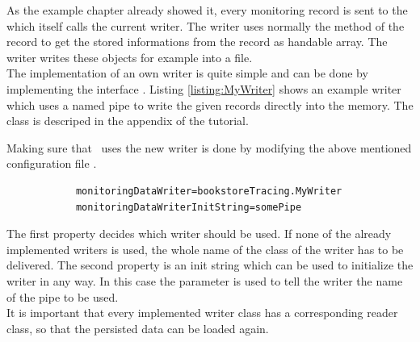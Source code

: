 		As the example chapter already showed it, every monitoring record is sent to the  which itself calls the current writer. The writer uses normally the  method of the record to get the stored informations from the record as handable array. The writer writes these objects for example into a file.\\
		The implementation of an own writer is quite simple and can be done by implementing the interface . Listing \ref{listing:MyWriter} shows an example writer which uses a named pipe to write the given records directly into the memory. The class  is descriped in the appendix of the tutorial. 

		\setJavaCodeListing
		

		Making sure that \Kieker\  uses the new writer is done by modifying the above mentioned configuration file \dir{\monitoringPropertiesFile}.

		\setBashListing       
		\begin{lstlisting}
			monitoringDataWriter=bookstoreTracing.MyWriter
			monitoringDataWriterInitString=somePipe
		\end{lstlisting}

		The first property decides which writer should be used. If none of the already implemented writers is used, the whole name of the class of the writer has to be delivered. The second property is an init string which can be used to initialize the writer in any way. In this case the parameter is used to tell the writer the name of the pipe to be used.\\
		\warning It is important that every implemented writer class has a corresponding reader class, so that the persisted data can be loaded again.
